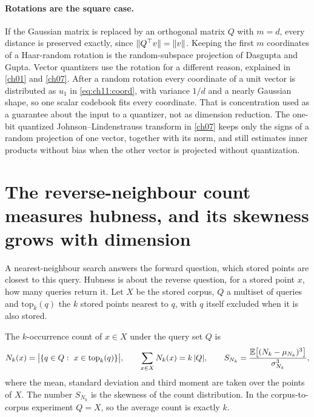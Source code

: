 \paragraph{Rotations are the square case.} If the Gaussian matrix is replaced by an orthogonal matrix $Q$ with $m=d$, every distance is preserved exactly, since $\lVert Q^{\top} v\rVert=\lVert v\rVert$. Keeping the first $m$ coordinates of a Haar-random rotation is the random-subspace projection of Dasgupta and Gupta. Vector quantizers use the rotation for a different reason, explained in \cref{ch01} and \cref{ch07}. After a random rotation every coordinate of a unit vector is distributed as $u_1$ in \cref{eq:ch11:coord}, with variance $1/d$ and a nearly Gaussian shape, so one scalar codebook fits every coordinate. That is concentration used as a guarantee about the input to a quantizer, not as dimension reduction. The one-bit quantized Johnson--Lindenstrauss transform in \cref{ch07} keeps only the signs of a random projection of one vector, together with its norm, and still estimates inner products without bias when the other vector is projected without quantization.


\section{The reverse-neighbour count measures hubness, and its skewness grows with dimension}\label{sec:ch11:hubs}

A nearest-neighbour search answers the forward question, which stored points are closest to this query. Hubness is about the reverse question, for a stored point $x$, how many queries return it. Let $X$ be the stored corpus, $Q$ a multiset of queries and $\mathrm{top}_k(q)$ the $k$ stored points nearest to $q$, with $q$ itself excluded when it is also stored.

\begin{definition}\label{def:ch11:nk}
The $k$-occurrence count of $x\in X$ under the query set $Q$ is
\begin{equation}\label{eq:ch11:nk}
N_k(x)=\big|\{q\in Q:\ x\in\mathrm{top}_k(q)\}\big|,\qquad
\sum_{x\in X}N_k(x)=k\,|Q|,\qquad
S_{N_k}=\frac{\mathbb{E}\big[(N_k-\mu_{N_k})^3\big]}{\sigma_{N_k}^3},
\end{equation}
where the mean, standard deviation and third moment are taken over the points of $X$. The number $S_{N_k}$ is the skewness of the count distribution. In the corpus-to-corpus experiment $Q=X$, so the average count is exactly $k$.
\end{definition}

